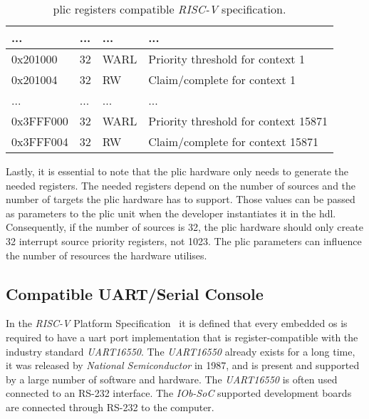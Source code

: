 \begin{table}[!htb]
\begin{tabular}{|l|l|l|l|}
    ...              & ...                  & ...                & ...                                               \\ \hline
    0x201000         & 32                   & WARL               & Priority threshold for context 1                  \\ \hline
    0x201004         & 32                   & RW                 & Claim/complete for context 1                      \\ \hline
    ...              & ...                  & ...                & ...                                               \\ \hline
    0x3FFF000        & 32                   & WARL               & Priority threshold for context 15871              \\ \hline
    0x3FFF004        & 32                   & RW                 & Claim/complete for context 15871                  \\ \hline
    \end{tabular}
    \caption{\acrshort{plic} registers compatible \textit{RISC-V} specification.}
    \label{tab:plic_spec_regs}
\end{table}


Lastly, it is essential to note that the \acrshort{plic} hardware only needs to generate the needed registers. The needed registers depend on the number of sources and the number of targets the \acrshort{plic} hardware has to support. Those values can be passed as parameters to the \acrshort{plic} unit when the developer instantiates it in the \acrlong{hdl}. Consequently, if the number of sources is 32, the \acrshort{plic} hardware should only create 32 interrupt source priority registers, not 1023. The \acrshort{plic} parameters can influence the number of resources the hardware utilises.

\subsection{Compatible UART/Serial Console}
\label{section:serial_console}
In the \textit{RISC-V} Platform Specification~\cite{riscv_platform_specification} it is defined that every embedded \acrfull{os} is required to have a \acrshort{uart} port implementation that is register-compatible with the industry standard \textit{UART16550}. The \textit{UART16550} already exists for a long time, it was released by \textit{National Semiconductor} in 1987, and is present and supported by a large number of software and hardware. The \textit{UART16550} is often used connected to an RS-232 interface. The \textit{IOb-SoC} supported development boards are connected through RS-232 to the computer.

